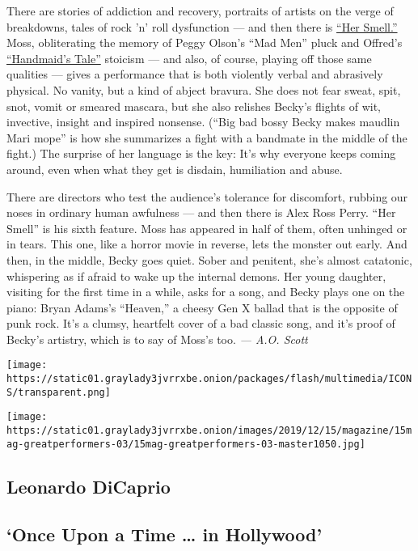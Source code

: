 There are stories of addiction and recovery, portraits of artists on the
verge of breakdowns, tales of rock 'n' roll dysfunction --- and then
there is
\href{https://www.nytimes3xbfgragh.onion/2019/04/10/movies/her-smell-review.html}{``Her
Smell.''} Moss, obliterating the memory of Peggy Olson's ``Mad Men''
pluck and Offred's
\href{https://www.nytimes3xbfgragh.onion/2019/08/29/books/testaments-margaret-atwood-handmaids-tale.html}{``Handmaid's
Tale''} stoicism --- and also, of course, playing off those same
qualities --- gives a performance that is both violently verbal and
abrasively physical. No vanity, but a kind of abject bravura. She does
not fear sweat, spit, snot, vomit or smeared mascara, but she also
relishes Becky's flights of wit, invective, insight and inspired
nonsense. (``Big bad bossy Becky makes maudlin Mari mope'' is how she
summarizes a fight with a bandmate in the middle of the fight.) The
surprise of her language is the key: It's why everyone keeps coming
around, even when what they get is disdain, humiliation and abuse.

There are directors who test the audience's tolerance for discomfort,
rubbing our noses in ordinary human awfulness --- and then there is Alex
Ross Perry. ``Her Smell'' is his sixth feature. Moss has appeared in
half of them, often unhinged or in tears. This one, like a horror movie
in reverse, lets the monster out early. And then, in the middle, Becky
goes quiet. Sober and penitent, she's almost catatonic, whispering as if
afraid to wake up the internal demons. Her young daughter, visiting for
the first time in a while, asks for a song, and Becky plays one on the
piano: Bryan Adams's ``Heaven,'' a cheesy Gen X ballad that is the
opposite of punk rock. It's a clumsy, heartfelt cover of a bad classic
song, and it's proof of Becky's artistry, which is to say of Moss's too.
\emph{--- A.O. Scott}

\texttt{[image: https://static01.graylady3jvrrxbe.onion/packages/flash/multimedia/ICONS/transparent.png]}

\texttt{[image: https://static01.graylady3jvrrxbe.onion/images/2019/12/15/magazine/15mag-greatperformers-03/15mag-greatperformers-03-master1050.jpg]}

\hypertarget{leonardo-dicaprio}{%
\subsection{Leonardo DiCaprio}\label{leonardo-dicaprio}}

\hypertarget{once-upon-a-time--in-hollywood-1}{%
\subsection{`Once Upon a Time \ldots{} in
Hollywood'}\label{once-upon-a-time--in-hollywood-1}}

